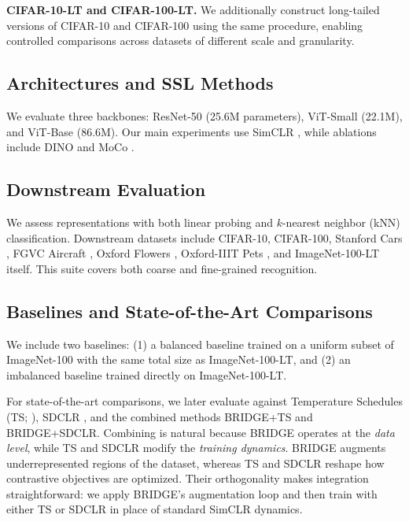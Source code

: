 \documentclass{article} %
\begin{document}
\noindent
\textbf{CIFAR-10-LT and CIFAR-100-LT.} 
We additionally construct long-tailed versions of CIFAR-10 and CIFAR-100 \citep{krizhevsky2009learning} using the same procedure, enabling controlled comparisons across datasets of different scale and granularity.  

\subsection{Architectures and SSL Methods}

We evaluate three backbones: ResNet-50 (25.6M parameters), ViT-Small (22.1M), and ViT-Base (86.6M). Our main experiments use SimCLR , while ablations include DINO  and MoCo .  

\subsection{Downstream Evaluation}

We assess representations with both linear probing and $k$-nearest neighbor (kNN) classification. Downstream datasets include CIFAR-10, CIFAR-100, Stanford Cars , FGVC Aircraft , Oxford Flowers , Oxford-IIIT Pets , and ImageNet-100-LT itself. This suite covers both coarse and fine-grained recognition.

\subsection{Baselines and State-of-the-Art Comparisons}

We include two baselines: (1) a balanced baseline trained on a uniform subset of ImageNet-100 with the same total size as ImageNet-100-LT, and (2) an imbalanced baseline trained directly on ImageNet-100-LT.  

For state-of-the-art comparisons, we later evaluate against Temperature Schedules (TS; \citep{ts}), SDCLR , and the combined methods BRIDGE+TS and BRIDGE+SDCLR. Combining is natural because BRIDGE operates at the \emph{data level}, while TS and SDCLR modify the \emph{training dynamics}. BRIDGE augments underrepresented regions of the dataset, whereas TS and SDCLR reshape how contrastive objectives are optimized. Their orthogonality makes integration straightforward: we apply BRIDGE’s augmentation loop and then train with either TS or SDCLR in place of standard SimCLR dynamics.
\end{document}
